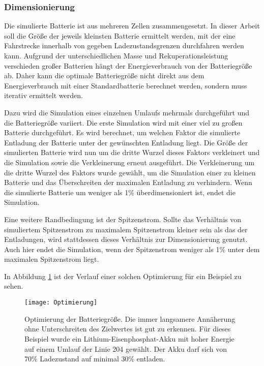 \subsubsection{Dimensionierung}

Die simulierte Batterie ist aus mehreren Zellen zusammengesetzt. In dieser Arbeit soll die Größe der jeweils kleinsten Batterie ermittelt werden, mit der eine Fahrstrecke innerhalb von gegeben Ladezustandsgrenzen durchfahren werden kann. Aufgrund der unterschiedlichen Masse und Rekuperationsleistung verschieden großer Batterien hängt der Energieverbrauch von der Batteriegröße ab. Daher kann die optimale Batteriegröße nicht direkt aus dem Energieverbrauch mit einer Standardbatterie berechnet werden, sondern muss iterativ ermittelt werden.

Dazu wird die Simulation eines einzelnen Umlaufs mehrmals durchgeführt und die Batteriegröße variiert. Die erste Simulation wird mit einer viel zu großen Batterie durchgeführt. Es wird berechnet, um welchen Faktor die simulierte Entladung der Batterie unter der gewünschten Entladung liegt. Die Größe der simulierten Batterie wird nun um die dritte Wurzel dieses Faktors verkleinert und die Simulation sowie die Verkleinerung erneut ausgeführt. Die Verkleinerung um die dritte Wurzel des Faktors wurde gewählt, um die Simulation einer zu kleinen Batterie und das Überschreiten der maximalen Entladung zu verhindern. Wenn die simulierte Batterie um weniger als 1\% überdimensioniert ist, endet die Simulation.

Eine weitere Randbedingung ist der Spitzenstrom. Sollte das Verhältnis von simuliertem Spitzenstrom zu maximalem Spitzenstrom kleiner sein als das der Entladungen, wird stattdessen dieses Verhältnis zur Dimensionierung genutzt. Auch hier endet die Simulation, wenn der Spitzenstrom weniger als 1\% unter dem maximalen Spitzenstrom liegt.

In Abbildung \ref{abb_Optimierung} ist der Verlauf einer solchen Optimierung für ein Beispiel zu sehen.

\begin{figure}\centering
	\texttt{[image: Optimierung]}
	\caption[Optimierung der Batteriegröße]{Optimierung der Batteriegröße. Die immer langsamere Annäherung ohne Unterschreiten des Zielwertes ist gut zu erkennen. Für dieses Beispiel wurde ein Lithium-Eisenphosphat-Akku mit hoher Energie auf einem Umlauf der Linie 204 gewählt. Der Akku darf sich von 70\% Ladezustand auf minimal 30\% entladen.}
	\label{abb_Optimierung}
\end{figure}

